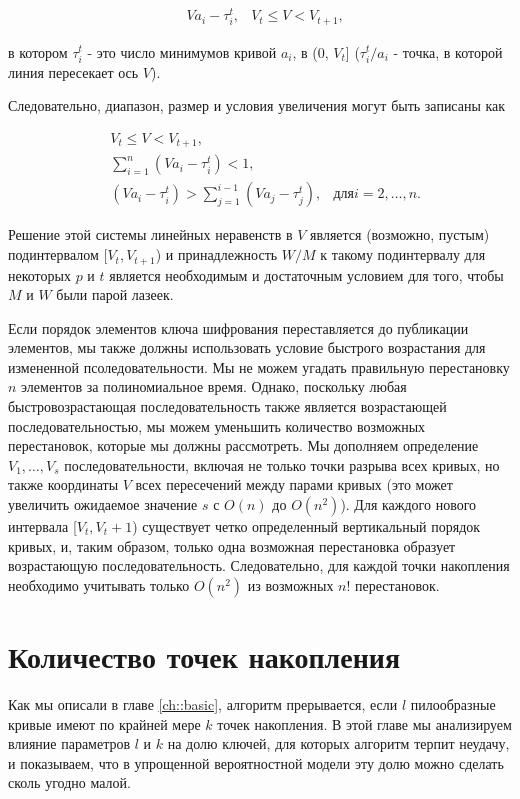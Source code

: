 \documentclass[a4paper,12pt]{report}
\begin{document}
\begin{align*}
&Va_i - \tau_i^{t}, &V_t \leq V < V_{t + 1},
\end{align*}

\noindent в котором $\tau_i^{t}$ - это число минимумов кривой $a_i$, в (0, $V_t$] ($\tau_i^{t}/a_i$ - точка, в которой линия пересекает ось $V$).

Следовательно, диапазон, размер и условия увеличения могут быть записаны как

\begin{align*}
&V_t \leq V < V_{t + 1}, \\
&\sum_{i = 1}^{n}(Va_i - \tau_i^{t}) < 1, \\
&(Va_i - \tau_i^{t}) > \sum_{j = 1}^{i - 1}(Va_j - \tau_j^{t}), & для i = 2, \ldots, n.
\end{align*}

\noindent Решение этой системы линейных неравенств в $V$ является (возможно, пустым) подинтервалом [$V_t, V_{t + 1}$) и принадлежность $W / M$ к такому подинтервалу для некоторых $p$ и $t$ является необходимым и достаточным условием для того, чтобы $M$ и $W$ были парой лазеек.

Если порядок элементов ключа шифрования переставляется до публикации элементов, мы также должны использовать условие быстрого возрастания для измененной псоледовательности. Мы не можем угадать правильную перестановку $n$ элементов за полиномиальное время. Однако, поскольку любая быстровозрастающая последовательность также является возрастающей последовательностью, мы можем уменьшить количество возможных перестановок, которые мы должны рассмотреть. Мы дополняем определение $V_1,\ldots,V_s$ последовательности, включая не только точки разрыва всех кривых, но также координаты $V$ всех пересечений между парами кривых (это может увеличить ожидаемое значение $s$ с $O(n)$ до $O(n^2)$). Для каждого нового интервала [$V_t,V_t+1$) существует четко определенный вертикальный порядок кривых, и, таким образом, только одна возможная перестановка образует возрастающую последовательность. Следовательно, для каждой точки накопления необходимо учитывать только $O(n^2)$ из возможных $n!$ перестановок.

\chapter{Количество точек накопления}\label{ch::points}

Как мы описали в главе \ref{ch::basic}, алгоритм прерывается, если $l$ пилообразные кривые имеют по крайней мере $k$ точек накопления. В этой главе мы анализируем влияние параметров $l$ и $k$ на долю ключей, для которых алгоритм терпит неудачу, и показываем, что в упрощенной вероятностной модели эту долю можно сделать сколь угодно малой.
\end{document}
